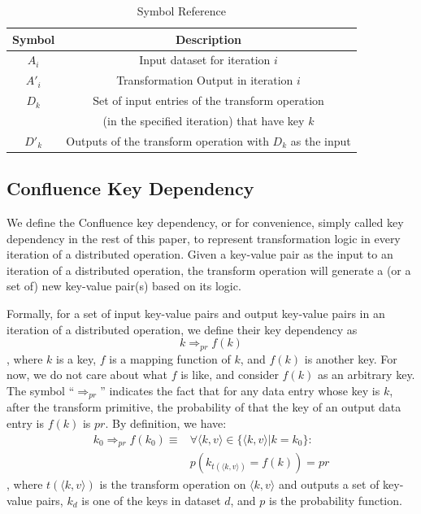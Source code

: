 \documentclass[10pt,journal,compsoc]{IEEEtran}
\begin{document}
\begin{table}[!t]
\renewcommand{\arraystretch}{1}
\caption{Symbol Reference}\label{table:symbol}
\centering
\begin{tabularx}{0.49\textwidth}{ c | c }
\hline
\textbf{Symbol} & \textbf{Description}  \\
\hline
$A_i$ & Input dataset for iteration $i$\\
\hline
$A'_i$  & Transformation Output in iteration $i$   \\
\hline
$D_k$ & Set of input entries of the transform operation \\
&(in the specified iteration) that have key $k$\\
\hline
$D'_k$ & Outputs of the transform operation with $D_k$ as the input\\
\hline
\end{tabularx}
\end{table}

\subsection{Confluence Key Dependency}\label{section:dependency}
We define the Confluence key dependency, or for convenience, 
simply called key dependency in the rest of this paper,
to represent transformation logic in every iteration
of a distributed operation. 
Given a key-value pair as the input to an iteration of a distributed operation,
the transform operation will generate a (or a set of) new key-value pair(s) based on its logic. 


Formally, for a set of input key-value pairs and output key-value pairs 
in an iteration of a distributed operation, 
we define their key dependency as 
\begin{equation}\label{eq:dependency}
k \Rightarrow_{pr} f(k)
\end{equation}
, where $k$ is a key, 
$f$ is a mapping function of $k$, 
and $f(k)$ is another key. 
For now, we do not care about what $f$ is like, and consider $f(k)$
as an arbitrary key. 
The symbol ``$\Rightarrow_{pr}$'' indicates the fact that 
for any data entry whose key is $k$, after the transform primitive, 
the probability of that the key of an output data entry is $f(k)$ is $pr$.
By definition, we have:
\begin{equation*}\label{eq:dependencyDefine}
\begin{aligned}
k_0 \Rightarrow_{pr} f(k_0) \equiv 
& \forall \langle k,v \rangle \in \{ \langle k,v \rangle | k = k_0\}: \\
& p(k_{t( \langle k,v \rangle)} = f(k)) = pr
\end{aligned}
\end{equation*}
, where $t(\langle k,v \rangle)$ is the transform operation on $\langle k,v \rangle$ and outputs 
a set of key-value pairs, $k_d$ is one of the keys in dataset $d$,
and $p$ is the probability function. 
\end{document}

